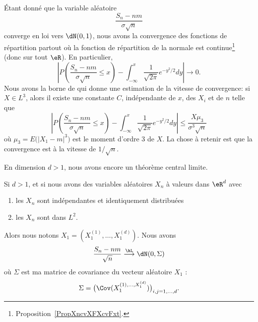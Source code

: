 \begin{remark}
	Étant donné que la variable aléatoire
	\begin{equation}
		\frac{ S_n-nm }{ \sigma\sqrt{n} }
	\end{equation}
	converge en loi vers \( \dN(0,1)\), nous avons la convergence des fonctions de répartition partout où la fonction de répartition de la normale est continue\footnote{Proposition~\ref{PropXncvXFXcvFxt}.} (donc sur tout \( \eR\)). En particulier,
	\begin{equation}
		\left| P\left( \frac{ S_n-nm }{ \sigma\sqrt{n} }\leq x \right)-\int_{-\infty}^x\frac{1}{ \sqrt{2\pi} } e^{-y^2/2}dy \right| \to 0.
	\end{equation}
	Nous avons la borne de  qui donne une estimation de la vitesse de convergence: si \( X\in L^3\), alors  il existe une constante \( C\), indépendante de \( x\), des \( X_i\) et de \( n\) telle que
	\begin{equation}
		\left| P\left( \frac{ S_n-nm }{ \sigma\sqrt{n} }\leq x \right)-\int_{-\infty}^x\frac{1}{ \sqrt{2\pi} } e^{-y^2/2}dy \right| \leq\frac{ X\mu_3 }{ \sigma^3\sqrt{n} }
	\end{equation}
	où \( \mu_3=E\big( | X_1-m |^3 \big)\) est le moment d'ordre \( 3\) de \( X\). La chose à retenir est que la convergence est à la vitesse de \( 1/\sqrt{n}\).
\end{remark}

En dimension \( d>1\), nous avons encore un théorème central limite.
\begin{theorem}
	Si \( d>1\), et si nous avons des variables aléatoires \( X_n\) à valeurs dans \( \eR^d\) avec
	\begin{enumerate}
		\item
		      les \( X_n\) sont indépendantes et identiquement distribuées
		\item
		      les \( X_n\) sont dans \( L^2\).
	\end{enumerate}
	Alors nous notons \( X_1=(X_1^{(1)},\ldots,X_1^{(d)})\). Nous avons
	\begin{equation}
		\frac{ S_n-nm }{ \sqrt{n} }\stackrel{\hL}{\longrightarrow}\dN(0,\Sigma)
	\end{equation}
	où \( \Sigma\) est ma matrice de covariance du vecteur aléatoire \( X_1\) :
	\begin{equation}
		\Sigma=\big( \Cov(X_1^{(1),\ldots,X_1^{(d)}}) \big)_{i,j=1,\ldots,d}.
	\end{equation}
\end{theorem}

